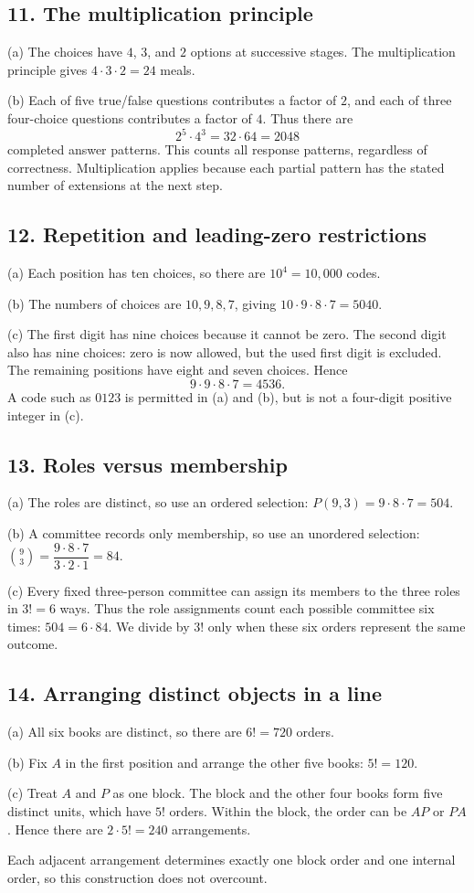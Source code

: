 \documentclass[11pt,letterpaper]{article}
\newcommand{\answer}[2]{\Needspace{2in}\subsection*{#1}#2}
\begin{document}
\answer{11. The multiplication principle}{(a) The choices have $4$, $3$, and $2$ options at successive stages. The multiplication principle gives $4\cdot3\cdot2=\boxed{24}$ meals.

(b) Each of five true/false questions contributes a factor of $2$, and each of three four-choice questions contributes a factor of $4$. Thus there are
\[
2^5\cdot4^3=32\cdot64=\boxed{2048}
\]
completed answer patterns. This counts all response patterns, regardless of correctness. Multiplication applies because each partial pattern has the stated number of extensions at the next step.}

\answer{12. Repetition and leading-zero restrictions}{(a) Each position has ten choices, so there are $10^4=\boxed{10{,}000}$ codes.

(b) The numbers of choices are $10,9,8,7$, giving $10\cdot9\cdot8\cdot7=\boxed{5040}$.

(c) The first digit has nine choices because it cannot be zero. The second digit also has nine choices: zero is now allowed, but the used first digit is excluded. The remaining positions have eight and seven choices. Hence
\[
9\cdot9\cdot8\cdot7=\boxed{4536}.
\]
A code such as $0123$ is permitted in (a) and (b), but is not a four-digit positive integer in (c).}

\answer{13. Roles versus membership}{(a) The roles are distinct, so use an ordered selection:
$P(9,3)=9\cdot8\cdot7=\boxed{504}$.

(b) A committee records only membership, so use an unordered selection:
$\binom93=\dfrac{9\cdot8\cdot7}{3\cdot2\cdot1}=\boxed{84}$.

(c) Every fixed three-person committee can assign its members to the three roles in $3!=6$ ways. Thus the role assignments count each possible committee six times: $504=6\cdot84$. We divide by $3!$ only when these six orders represent the same outcome.}

\answer{14. Arranging distinct objects in a line}{(a) All six books are distinct, so there are $6!=\boxed{720}$ orders.

(b) Fix $A$ in the first position and arrange the other five books: $5!=\boxed{120}$.

(c) Treat $A$ and $P$ as one block. The block and the other four books form five distinct units, which have $5!$ orders. Within the block, the order can be $AP$ or $PA$. Hence there are $2\cdot5!=\boxed{240}$ arrangements.

Each adjacent arrangement determines exactly one block order and one internal order, so this construction does not overcount.}
\end{document}
